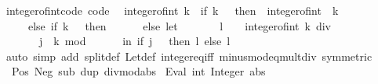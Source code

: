 \begin{isabellebody}
\ integer{\isacharunderscore}{\kern0pt}of{\isacharunderscore}{\kern0pt}int{\isacharunderscore}{\kern0pt}code\ {\isacharbrackleft}{\kern0pt}code{\isacharbrackright}{\kern0pt}{\isacharcolon}{\kern0pt}\isanewline
\ \ {\isachardoublequoteopen}integer{\isacharunderscore}{\kern0pt}of{\isacharunderscore}{\kern0pt}int\ k\ {\isacharequal}{\kern0pt}\ {\isacharparenleft}{\kern0pt}if\ k\ {\isacharless}{\kern0pt}\ {}\ then\ {\isacharminus}{\kern0pt}\ {\isacharparenleft}{\kern0pt}integer{\isacharunderscore}{\kern0pt}of{\isacharunderscore}{\kern0pt}int\ {\isacharparenleft}{\kern0pt}{\isacharminus}{\kern0pt}\ k{\isacharparenright}{\kern0pt}{\isacharparenright}{\kern0pt}\isanewline
\ \ \ \ \ else\ if\ k\ {\isacharequal}{\kern0pt}\ {}\ then\ {}\isanewline
\ \ \ \ \ else\ let\isanewline
\ \ \ \ \ \ \ l\ {\isacharequal}{\kern0pt}\ {}\ {\isacharasterisk}{\kern0pt}\ integer{\isacharunderscore}{\kern0pt}of{\isacharunderscore}{\kern0pt}int\ {\isacharparenleft}{\kern0pt}k\ div\ {}{\isacharparenright}{\kern0pt}{\isacharsemicolon}{\kern0pt}\isanewline
\ \ \ \ \ \ \ j\ {\isacharequal}{\kern0pt}\ k\ mod\ {}\isanewline
\ \ \ \ \ in\ if\ j\ {\isacharequal}{\kern0pt}\ {}\ then\ l\ else\ l\ {\isacharplus}{\kern0pt}\ {}{\isacharparenright}{\kern0pt}{\isachardoublequoteclose}\isanewline
%
\isadelimproof
\ \ %
\endisadelimproof
%
\isatagproof
{}\isamarkupfalse%
\ {\isacharparenleft}{\kern0pt}auto\ simp\ add{\isacharcolon}{\kern0pt}\ split{\isacharunderscore}{\kern0pt}def\ Let{\isacharunderscore}{\kern0pt}def\ integer{\isacharunderscore}{\kern0pt}eq{\isacharunderscore}{\kern0pt}iff\ minus{\isacharunderscore}{\kern0pt}mod{\isacharunderscore}{\kern0pt}eq{\isacharunderscore}{\kern0pt}mult{\isacharunderscore}{\kern0pt}div\ {\isacharbrackleft}{\kern0pt}symmetric{\isacharbrackright}{\kern0pt}{\isacharparenright}{\kern0pt}%
\endisatagproof
{\isafoldproof}%
%
\isadelimproof
\isanewline
%
\endisadelimproof
\isanewline
{}\isamarkupfalse%
\ {\isacharparenleft}{\kern0pt}\ Pos\ Neg\ sub\ dup\ divmod{\isacharunderscore}{\kern0pt}abs%
\isadelimdocument
%
\endisadelimdocument
%
\isatagdocument
%
\isamarkuptrue%
%
\endisatagdocument
{\isafolddocument}%
%
\isadelimdocument
%
\endisadelimdocument
{}\isamarkupfalse%
\ Eval\ int\ Integer\ abs\isanewline
\isanewline
{}\isamarkupfalse%

\end{isabellebody}
